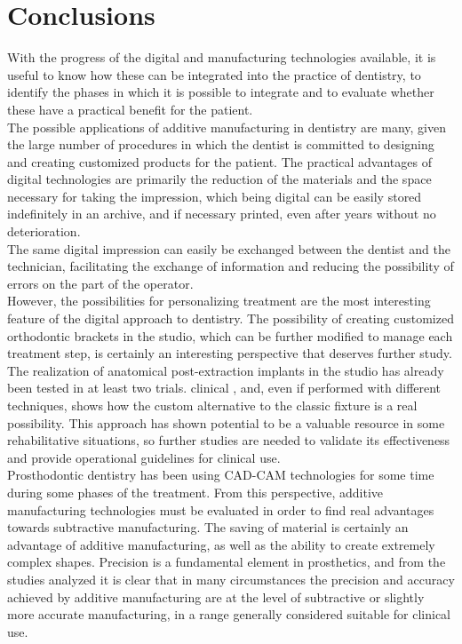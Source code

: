 
\chapter{Conclusions} %

\label{Conclusions} %

 
 
With the progress of the digital and manufacturing technologies available, it is useful to know how these can be integrated into the practice of dentistry, to identify the phases in which it is possible to integrate and to evaluate whether these have a practical benefit for the patient.\\
The possible applications of additive manufacturing in dentistry are many, given the large number of procedures in which the dentist is committed to designing and creating customized products for the patient. The practical advantages of digital technologies are primarily the reduction of the materials and the space necessary for taking the impression, which being digital can be easily stored indefinitely in an archive, and if necessary printed, even after years without no deterioration. \\
The same digital impression can easily be exchanged between the dentist and the technician, facilitating the exchange of information and reducing the possibility of errors on the part of the operator.\\
However, the possibilities for personalizing treatment are the most interesting feature of the digital approach to dentistry. The possibility of creating customized orthodontic brackets in the studio, which can be further modified to manage each treatment step, is certainly an interesting perspective that deserves further study. \\ The realization of anatomical post-extraction implants in the studio has already been tested in at least two trials. clinical \parencite{Reference85}, \parencite{Reference87} and, even if performed with different techniques, shows how the custom alternative to the classic fixture is a real possibility. This approach has shown potential to be a valuable resource in some rehabilitative situations, so further studies are needed to validate its effectiveness and provide operational guidelines for clinical use.\\
Prosthodontic dentistry has been using CAD-CAM technologies for some time during some phases of the treatment. From this perspective, additive manufacturing technologies must be evaluated in order to find real advantages towards subtractive manufacturing. The saving of material is certainly an advantage of additive manufacturing, as well as the ability to create extremely complex shapes. Precision is a fundamental element in prosthetics, and from the studies analyzed it is clear that in many circumstances the precision and accuracy achieved by additive manufacturing are at the level of subtractive or slightly more accurate manufacturing, in a range generally considered suitable for clinical use. \\
